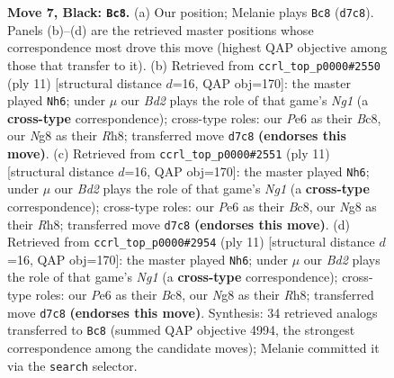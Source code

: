 \documentclass[11pt]{article}
\begin{document}
\begin{figure}[p]
\caption{\textbf{Move 7, Black: \texttt{Bc8}.} (a) Our position; Melanie plays \texttt{Bc8} (\texttt{d7c8}). Panels (b)--(d) are the retrieved master positions whose correspondence most drove this move (highest QAP objective among those that transfer to it). (b) Retrieved from \texttt{ccrl\_top\_p0000\#2550} (ply 11) [structural distance $d$=16, QAP obj=170]: the master played \texttt{Nh6}; under $\mu$ our \emph{Bd2} plays the role of that game's \emph{Ng1} (a \textbf{cross-type} correspondence); cross-type roles: our \emph{P}e6 as their \emph{B}c8, our \emph{N}g8 as their \emph{R}h8; transferred move \texttt{d7c8} \textbf{(endorses this move)}. (c) Retrieved from \texttt{ccrl\_top\_p0000\#2551} (ply 11) [structural distance $d$=16, QAP obj=170]: the master played \texttt{Nh6}; under $\mu$ our \emph{Bd2} plays the role of that game's \emph{Ng1} (a \textbf{cross-type} correspondence); cross-type roles: our \emph{P}e6 as their \emph{B}c8, our \emph{N}g8 as their \emph{R}h8; transferred move \texttt{d7c8} \textbf{(endorses this move)}. (d) Retrieved from \texttt{ccrl\_top\_p0000\#2954} (ply 11) [structural distance $d$=16, QAP obj=170]: the master played \texttt{Nh6}; under $\mu$ our \emph{Bd2} plays the role of that game's \emph{Ng1} (a \textbf{cross-type} correspondence); cross-type roles: our \emph{P}e6 as their \emph{B}c8, our \emph{N}g8 as their \emph{R}h8; transferred move \texttt{d7c8} \textbf{(endorses this move)}. Synthesis: 34 retrieved analogs transferred to \texttt{Bc8} (summed QAP objective 4994, the strongest correspondence among the candidate moves); Melanie committed it via the \texttt{search} selector.}
\label{fig:thought-m13}
\end{figure}

\clearpage
\end{document}
